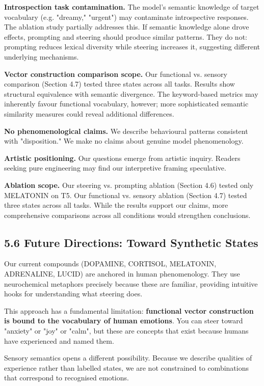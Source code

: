 \documentclass[11pt,a4paper]{article}
\begin{document}
\textbf{Introspection task contamination.} The model's semantic knowledge of target vocabulary (e.g. "dreamy," "urgent") may contaminate introspective responses. The ablation study partially addresses this. If semantic knowledge alone drove effects, prompting and steering should produce similar patterns. They do not: prompting reduces lexical diversity while steering increases it, suggesting different underlying mechanisms.

\textbf{Vector construction comparison scope.} Our functional vs. sensory comparison (Section 4.7) tested three states across all tasks. Results show structural equivalence with semantic divergence. The keyword-based metrics may inherently favour functional vocabulary, however; more sophisticated semantic similarity measures could reveal additional differences.

\textbf{No phenomenological claims.} We describe behavioural patterns consistent with "disposition." We make no claims about genuine model phenomenology.

\textbf{Artistic positioning.} Our questions emerge from artistic inquiry. Readers seeking pure engineering may find our interpretive framing speculative.

\textbf{Ablation scope.} Our steering vs. prompting ablation (Section 4.6) tested only MELATONIN on T5. Our functional vs. sensory ablation (Section 4.7) tested three states across all tasks. While the results support our claims, more comprehensive comparisons across all conditions would strengthen conclusions.

\subsection*{5.6 Future Directions: Toward Synthetic States}

Our current compounds (DOPAMINE, CORTISOL, MELATONIN, ADRENALINE, LUCID) are anchored in human phenomenology. They use neurochemical metaphors precisely because these are familiar, providing intuitive hooks for understanding what steering does.

This approach has a fundamental limitation: \textbf{functional vector construction is bound to the vocabulary of human emotions}. You can steer toward "anxiety" or "joy" or "calm", but these are concepts that exist because humans have experienced and named them.

Sensory semantics opens a different possibility. Because we describe qualities of experience rather than labelled states, we are not constrained to combinations that correspond to recognised emotions.
\end{document}
